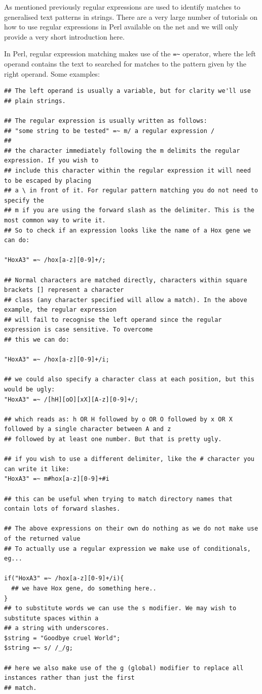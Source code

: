 \documentclass[11pt]{article}
\begin{document}
As mentioned previously regular expressions are used to identify matches
to generalised text patterns in strings. There are a very large number
of tutorials on how to use regular expressions in Perl available on the
net and we will only provide a very short introduction here.

In Perl, regular expression matching makes use of the \texttt{=\textasciitilde{}} operator,
where the left operand contains the text to searched for matches to the
pattern given by the right operand. Some examples:

\begin{verbatim}
## The left operand is usually a variable, but for clarity we'll use
## plain strings.

## The regular expression is usually written as follows:
## "some string to be tested" =~ m/ a regular expression /
##
## the character immediately following the m delimits the regular expression. If you wish to
## include this character within the regular expression it will need to be escaped by placing
## a \ in front of it. For regular pattern matching you do not need to specify the
## m if you are using the forward slash as the delimiter. This is the most common way to write it.
## So to check if an expression looks like the name of a Hox gene we can do:

"HoxA3" =~ /hox[a-z][0-9]+/;

## Normal characters are matched directly, characters within square brackets [] represent a character
## class (any character specified will allow a match). In the above example, the regular expression
## will fail to recognise the left operand since the regular expression is case sensitive. To overcome
## this we can do:

"HoxA3" =~ /hox[a-z][0-9]+/i;

## we could also specify a character class at each position, but this would be ugly:
"HoxA3" =~ /[hH][oO][xX][A-z][0-9]+/;

## which reads as: h OR H followed by o OR O followed by x OR X followed by a single character between A and z
## followed by at least one number. But that is pretty ugly.

## if you wish to use a different delimiter, like the # character you can write it like:
"HoxA3" =~ m#hox[a-z][0-9]+#i

## this can be useful when trying to match directory names that contain lots of forward slashes.

## The above expressions on their own do nothing as we do not make use of the returned value
## To actually use a regular expression we make use of conditionals, eg...

if("HoxA3" =~ /hox[a-z][0-9]+/i){
  ## we have Hox gene, do something here..
}
## to substitute words we can use the s modifier. We may wish to substitute spaces within a
## a string with underscores.
$string = "Goodbye cruel World";
$string =~ s/ /_/g;

## here we also make use of the g (global) modifier to replace all instances rather than just the first
## match.
\end{verbatim}
\end{document}

